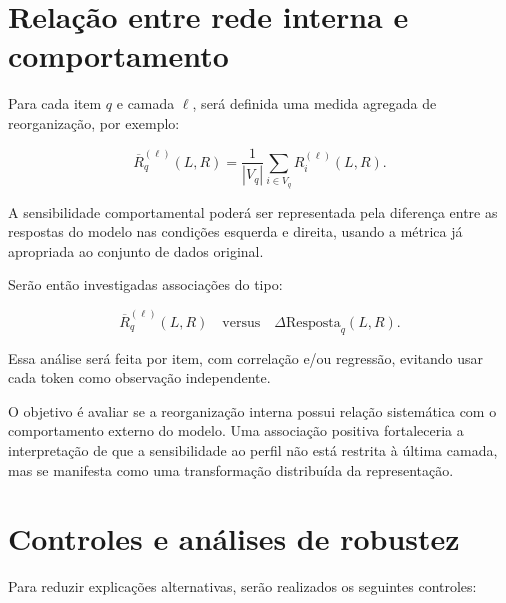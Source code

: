\documentclass[11pt,a4paper]{article}
\begin{document}
\section{Relação entre rede interna e comportamento}

Para cada item $q$ e camada $\ell$, será definida uma medida agregada de reorganização, por exemplo:

\[
\overline{R}_q^{(\ell)}(L,R)
=
\frac{1}{|V_q|}
\sum_{i\in V_q}
R_i^{(\ell)}(L,R).
\]

A sensibilidade comportamental poderá ser representada pela diferença entre as respostas do modelo nas condições esquerda e direita, usando a métrica já apropriada ao conjunto de dados original.

Serão então investigadas associações do tipo:

\[
\overline{R}_q^{(\ell)}(L,R)
\quad \text{versus} \quad
\Delta \mathrm{Resposta}_q(L,R).
\]

Essa análise será feita por item, com correlação e/ou regressão, evitando usar cada token como observação independente.

O objetivo é avaliar se a reorganização interna possui relação sistemática com o comportamento externo do modelo. Uma associação positiva fortaleceria a interpretação de que a sensibilidade ao perfil não está restrita à última camada, mas se manifesta como uma transformação distribuída da representação.

\section{Controles e análises de robustez}

Para reduzir explicações alternativas, serão realizados os seguintes controles:
\end{document}
